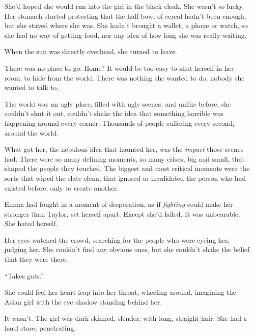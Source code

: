 She'd hoped she would run into the girl in the black cloak.  She wasn't so lucky.  Her stomach started protesting that the half-bowl of cereal hadn't been enough, but she stayed where she was.  She hadn't brought a wallet, a phone or watch, so she had no way of getting food, nor any idea of how long she was really waiting.



When the sun was directly overhead, she turned to leave.



There was no place to go.  Home?  It would be too easy to shut herself in her room, to hide from the world.  There was nothing she wanted to do, nobody she wanted to talk to.



The world was an ugly place, filled with ugly scenes, and unlike before, she couldn't shut it out, couldn't shake the idea that something horrible was happening around every corner.  Thousands of people suffering every second, around the world.



What got her, the nebulous idea that haunted her, was the \emph{impact} those scenes had.  There were so many defining moments, so many crises, big and small, that shaped the people they touched.  The biggest and most critical moments were the sorts that wiped the slate clean, that ignored or invalidated the person who had existed before, only to create another.



Emma had fought in a moment of desperation, as if \emph{fighting} could make her stronger than Taylor, set herself apart.  Except she'd failed.  It was unbearable.  She hated herself.



Her eyes watched the crowd, searching for the people who were eyeing her, judging her.  She couldn't find any obvious ones, but she couldn't shake the belief that they were there.



``Takes guts.''



She could feel her heart leap into her throat, wheeling around, imagining the Asian girl with the eye shadow standing behind her.



It wasn't.  The girl was dark-skinned, slender, with long, straight hair.  She had a hard stare, penetrating.



